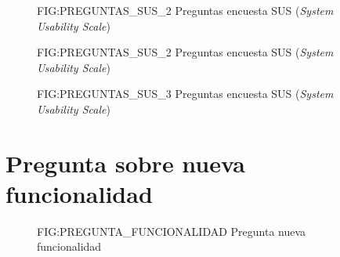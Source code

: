 \begin{figure}[Preguntas encuesta SUS (\textit{System Usability Scale}) Parte 2]{FIG:PREGUNTAS_SUS_2}
    {Preguntas encuesta SUS (\textit{System Usability Scale})}
\end{figure}

\begin{figure}[Preguntas encuesta SUS (\textit{System Usability Scale}) Parte 3]{FIG:PREGUNTAS_SUS_2}
    {Preguntas encuesta SUS (\textit{System Usability Scale})}
\end{figure}

\begin{figure}[Preguntas encuesta SUS (\textit{System Usability Scale}) Parte 4]{FIG:PREGUNTAS_SUS_3}
    {Preguntas encuesta SUS (\textit{System Usability Scale})}
\end{figure}

\newpage

\section{Pregunta sobre nueva funcionalidad\label{SEC:PREGUNTA_FUNCIONALIDAD}}

\begin{figure}[Pregunta nueva funcionalidad]{FIG:PREGUNTA_FUNCIONALIDAD}
    {Pregunta nueva funcionalidad}
\end{figure}